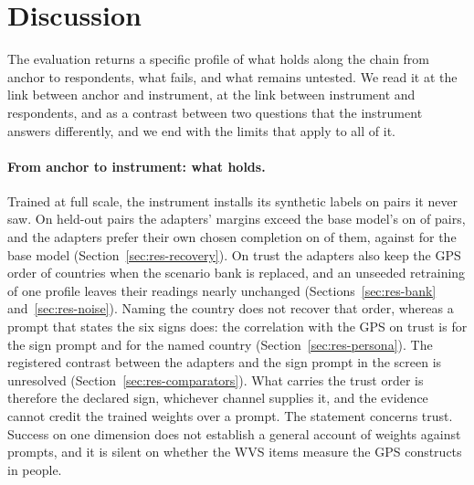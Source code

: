 \section{Discussion}\label{sec:discussion}

The evaluation returns a specific profile of what holds along the chain from anchor to respondents, what fails, and what remains untested. We read it at the link between anchor and instrument, at the link between instrument and respondents, and as a contrast between two questions that the instrument answers differently, and we end with the limits that apply to all of it.

\paragraph{From anchor to instrument: what holds.} Trained at full scale, the instrument installs its synthetic labels on pairs it never saw. On held-out pairs the adapters' margins exceed the base model's on  of pairs, and the adapters prefer their own chosen completion on  of them, against  for the base model (Section~\ref{sec:res-recovery}). On trust the adapters also keep the GPS order of countries when the scenario bank is replaced, and an unseeded retraining of one profile leaves their readings nearly unchanged (Sections~\ref{sec:res-bank} and~\ref{sec:res-noise}). Naming the country does not recover that order, whereas a prompt that states the six signs does: the correlation with the GPS on trust is   for the sign prompt and   for the named country (Section~\ref{sec:res-persona}). The registered contrast between the adapters and the sign prompt in the screen is unresolved (Section~\ref{sec:res-comparators}). What carries the trust order is therefore the declared sign, whichever channel supplies it, and the evidence cannot credit the trained weights over a prompt. The statement concerns trust. Success on one dimension does not establish a general account of weights against prompts, and it is silent on whether the WVS items measure the GPS constructs in people.

